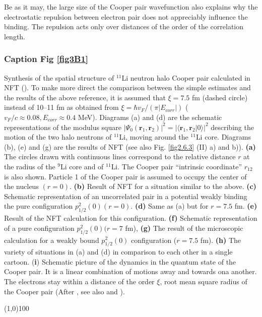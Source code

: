 \begin{subappendices}
         
Be as it may, the large size of the Cooper pair wavefunction also explains why the electrostatic repulsion between electron pair does not appreciably influence the binding. The repulsion acts only over distances of the order of the correlation length. 

         \subsubsection{Caption Fig \ref{fig3B1}}
         Synthesis of the spatial structure of $^{11}$Li neutron halo Cooper pair calculated in NFT (\cite{Barranco:01}). To make more direct the comparison between the simple estimates and the results of the above reference, it is assumed that $\xi=7.5$ fm (dashed circle) instead of 10--11 fm as obtained from $\xi=\hbar v_F/(\pi |E_{corr}|)$ ($v_F/c\approx 0.08, E_{corr}\approx 0.4$ MeV). Diagrams (a) and (d) are the schematic representations of the modulus square $|\Psi_0(\mathbf r_1, \mathbf r_2)|^2=|\langle\mathbf r_1, \mathbf r_2|0\rangle|^2$ describing the motion of the two halo neutrons of $^{11}$Li, moving around the $^{11}$Li core. Diagrams (b), (e) and (g) are the results of NFT (see also Fig. \ref{fig2.6.3} (II) a) and b)). \textbf{(a)} The  circles drawn with continuous lines correspond to the relative distance $r$ at the radius of the $^{9}$Li core and of $^{11}$Li. The Cooper pair ``intrinsic coordinate'' $r_{12}$ is also shown. Particle 1 of the Cooper pair is assumed to occupy the center of the nucleus $(r=0)$. \textbf{(b)} Result of NFT for a situation similar to the above. \textbf{(c)} Schematic representation of an uncorrelated pair in a potential weakly binding the pure configuration $p^2_{1/2}(0) (r=0)$. \textbf{(d)} Same as (a) but for $r=7.5$ fm. \textbf{(e)} Result of the NFT calculation for this configuration. \textbf{(f)} Schematic representation of a pure configuration $p^2_{1/2}(0) (r=7$ fm), \textbf{(g)} The result of the microscopic calculation for a weakly bound $p^2_{1/2}(0)$ configuration ($r=7.5$ fm). \textbf{(h)} The variety of situations in (a) and (d) in comparison to each other in a single cartoon. (\textbf{i}) Schematic picture of the dynamics in the quantum state of the Cooper pair. It is a linear combination of motions away and towards ona another. The electrons stay within a distance of the order $\xi$, root mean square radius of the Cooper pair (After \cite{Weisskopf:81}, see also \cite{Kadin:07} and \cite{VanWitsen:14}).
\begin{center}
	\line(1,0){100}
\end{center}
         

\end{subappendices}
